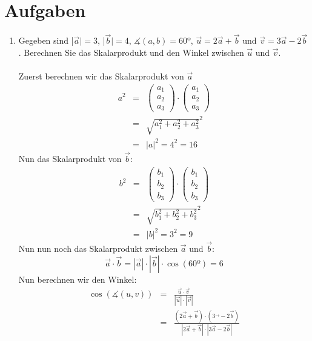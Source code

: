 \section{Aufgaben}
\begin{enumerate}
	\item Gegeben sind |$\vec{a}|=3$, |$\vec{b}|=4$, $\measuredangle(a,b) = 60º$, $\vec{u}=2\vec{a}+\vec{b}$ und $\vec{v}=3\vec{a}-2\vec{b}$. Berechnen Sie das Skalarprodukt und den Winkel zwischen $\vec{u}$ und $\vec{v}$.\\\\
	Zuerst berechnen wir das Skalarprodukt von $\vec{a}$
	\begin{eqnarray*}
		  a^2 &=& \begin{pmatrix}a_1\\a_2\\a_3\end{pmatrix} \cdot \begin{pmatrix}a_1\\a_2\\a_3\end{pmatrix} \\
			&=& \sqrt{a_{1}^{2} + a_{2}^{2}+a_{3}^{2}}^2\\
			&=& |a|^2 = 4^2 = 16
	\end{eqnarray*}
	Nun das Skalarprodukt von $\vec{b}$:
	\begin{eqnarray*}
		b^2 &=& \begin{pmatrix}b_1\\b_2\\b_3\end{pmatrix} \cdot \begin{pmatrix}b_1\\b_2\\b_3\end{pmatrix}\\ 
		&=& \sqrt{b_{1}^{2} + b_{2}^{2}+b_{3}^{2}}^2\\
		&=& |b|^2 = 3^2 = 9
	\end{eqnarray*}
	Nun nun noch das Skalarprodukt zwischen $\vec{a}$ und $\vec{b}$:
	\begin{equation*}
		\vec{a}\cdot \vec{b} = |\vec{a}| \cdot |\vec{b}| \cdot \cos(60º) = 6
	\end{equation*}
	Nun berechnen wir den Winkel:
	\begin{eqnarray*}
	\cos(\measuredangle (u,v)) &=& \frac{\vec{u}\cdot \vec{v}}{|\vec{u}|\cdot |\vec{v}|}\\
	&=&\frac{(2\vec{a}+\vec{b})\cdot (3\vec{}-2\vec{b})}{|2\vec{a} + \vec{b}| \cdot |3\vec{a}-2\vec{b}|} \\

\end{eqnarray*}
\end{enumerate}
